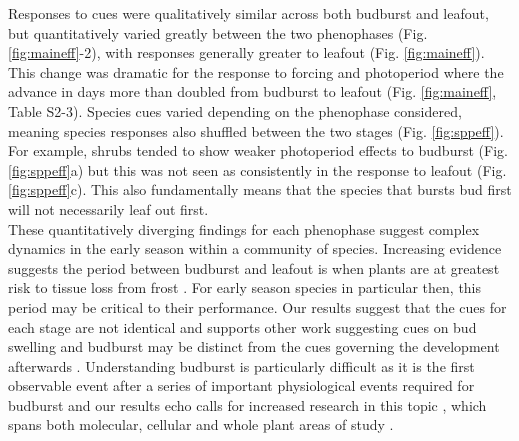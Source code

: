 \documentclass[11pt]{article}
\begin{document}
Responses to cues were qualitatively similar across both budburst and leafout, but quantitatively varied greatly between the two phenophases (Fig. \ref{fig:maineff}-2), with responses generally greater to leafout (Fig. \ref{fig:maineff}). This change was dramatic for the response to forcing and photoperiod where the advance in days more than doubled from budburst to leafout (Fig. \ref{fig:maineff}, Table S2-3). Species cues varied depending on the phenophase considered, meaning species responses also shuffled between the two stages (Fig. \ref{fig:sppeff}). For example, shrubs tended to show weaker photoperiod effects to budburst (Fig. \ref{fig:sppeff}a) but this was not seen as consistently in the response to leafout (Fig. \ref{fig:sppeff}c). This also fundamentally means that the species that bursts bud first will not necessarily leaf out first. \\

These quantitatively diverging findings for each phenophase suggest complex dynamics in the early season within a community of species. Increasing evidence suggests the period between budburst and leafout is when plants are at greatest risk to tissue loss from frost \citep{Lenz:2013aa}. For early season species in particular then, this period may be critical to their performance. Our results suggest that the cues for each stage are not identical and supports other work suggesting cues on bud swelling and budburst may be distinct from the cues governing the development afterwards \citep{Basler:2014aa}. Understanding budburst is particularly difficult as it is the first observable event after a series of important physiological events required for budburst \citep[endo and ecodormancy,][]{Caffarra:2011aa,vitasse2014rev} and our results echo calls for increased research in this topic \citep{chuine2016}, which spans both molecular, cellular and whole plant areas of study \citep{Morin:2009,rinne2011,singh2017}. \\
\end{document}
